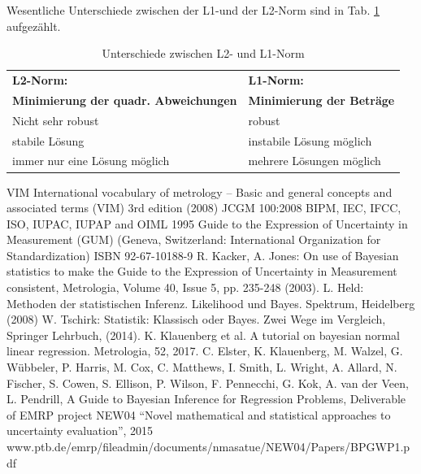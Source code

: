 Wesentliche Unterschiede zwischen der L1-und der L2-Norm sind in 
Tab. \ref{tab:L2_und_L1_Norm} aufgezählt.
\begin{table}[!htbp]
	\caption{Unterschiede zwischen L2- und L1-Norm}
	\label{tab:L2_und_L1_Norm}
	\centering
	\begin{tabular}{|m{8cm} | m{8cm}| }  \hline
	\textbf{L2-Norm:} & \textbf{L1-Norm:} \\
  \textbf{Minimierung der quadr. Abweichungen} & \textbf{Minimierung der Beträge} \\ \hline
   Nicht sehr robust & robust \\ \hline
   stabile Lösung & instabile Lösung möglich \\\hline
   immer nur eine Lösung möglich & mehrere Lösungen möglich \\\hline
	\end{tabular}
\end{table}


\begin{thebibliography}{------}
 \item[] \hspace*{5em}{\Large\bf zu Kapitel 8:}
 VIM International vocabulary of
metrology – Basic and general
concepts and associated terms (VIM) 3rd edition (2008)
 JCGM 100:2008 BIPM, IEC, IFCC, ISO, IUPAC, IUPAP and OIML 1995 Guide to the Expression of Uncertainty in Measurement (GUM)
(Geneva, Switzerland: International Organization for
Standardization) ISBN 92-67-10188-9
 R. Kacker, A. Jones: On use of Bayesian statistics to make the Guide to the Expression of Uncertainty in Measurement consistent, 
	Metrologia, Volume 40, Issue 5, pp. 235-248 (2003).
 L. Held: Methoden der statistischen Inferenz. 
Likelihood und Bayes. Spektrum, Heidelberg (2008)
 W. Tschirk: Statistik: Klassisch oder Bayes.
Zwei Wege im Vergleich, Springer Lehrbuch, (2014).
 K. Klauenberg et al. A tutorial on bayesian normal linear regression. Metrologia, 52, 2017.
 C. Elster, K. Klauenberg, M. Walzel, G. Wübbeler, P. Harris, M. Cox, C. Matthews, I. Smith, L. Wright, A. Allard, N. Fischer, S. Cowen, S. Ellison,
P. Wilson, F. Pennecchi, G. Kok, A. van der Veen, L. Pendrill,
A Guide to Bayesian Inference for Regression Problems, Deliverable of EMRP project NEW04 “Novel mathematical and statistical approaches to uncertainty evaluation”, 2015 \newline
www.ptb.de/emrp/fileadmin/documents/nmasatue/NEW04/Papers/BPGWP1.pdf
\end{thebibliography}



